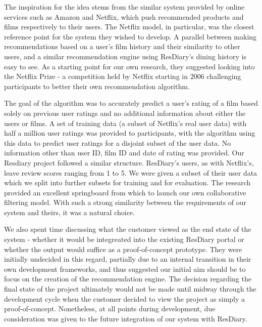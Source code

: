\documentclass{l3proj}
\begin{document}
The inspiration for the idea stems from the similar system provided by online services such as Amazon and Netflix, which push recommended products and films respectively to their users. The Netflix model, in particular, was the closest reference point for the system they wished to develop. A parallel between making recommendations based on a user's film history and their similarity to other users, and a similar recommendation engine using ResDiary's dining history is easy to see. As a starting point for our own research, they suggested looking into the Netflix Prize - a competition held by Netflix starting in 2006 challenging participants to better their own recommendation algorithm. 

The goal of the algorithm was to accurately predict a user's rating of a film based solely on previous user ratings and no additional information about either the users or films. A set of training data (a subset of Netflix's real user data) with half a million user ratings was provided to participants, with the algorithm using this data to predict user ratings for a disjoint subset of the user data. No information other than user ID, film ID and date of rating was provided. Our Resdiary project followed a similar structure. ResDiary's users, as with Netflix's, leave review scores ranging from 1 to 5. We were given a subset of their user data which we split into further subsets for training and for evaluation. The research provided an excellent springboard from which to launch our own collaborative filtering model. With such a strong similarity between the requirements of our system and theirs, it was a natural choice.


We also spent time discussing what the customer viewed as the end state of the system - whether it would be integreated into the existing ResDiary portal or whether the output would suffice as a proof-of-concept prototype. They were initially undecided in this regard, partially due to an internal transition in their own development frameworks, and thus suggested our initial aim should be to focus on the creation of the recommendation engine. The decision regarding the final state of the project ultimately would not be made until midway through the development cycle when the customer decided to view the project as simply a proof-of-concept. Nonetheless, at all points during development, due consideration was given to the future integration of our system with ResDiary. 
\end{document}

